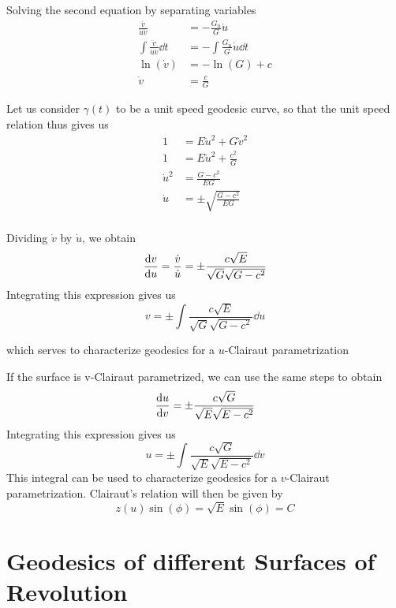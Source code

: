 \documentclass[12pt]{article}
\begin{document}
Solving the second equation by separating variables
\begin{align*}
    \frac{\ddot{v}}{\dot{u}\dot{v}} &= -\frac{G_{u}}{G}\dot{u} \\
    \int \frac{\ddot{v}}{\dot{u}\dot{v}} \dd{t} &= -\int \frac{G_{u}}{G}\dot{u} \dd{t} \\
    \ln(\dot{v}) &= -\ln(G) + c \\
    \dot{v} &= \frac{c}{G}
\end{align*}

Let us consider $\gamma(t)$ to be a unit speed geodesic curve, so that the unit speed relation thus gives us
\begin{align*}
    1 &= E \dot{u}^2 + G \dot{v}^2 \\
    1 &= E \dot{u}^2 + \frac{c^2}{G} \\
    \dot{u}^2 &= \frac{G - c^2}{EG} \\
    \dot{u} &= \pm \sqrt{\frac{G - c^2}{EG}} \\
\end{align*}

Dividing $\dot{v}$ by $\dot{u}$, we obtain
\[
    \dv{v}{u} = \frac{\dot{v}}{\dot{u}} = \pm \frac{c\sqrt{E}}{\sqrt{G}\sqrt{G - c^{2}}} 
\]
Integrating this expression gives us
\begin{equation} \label{eq:v_Clairaut_integral}
    v = \pm \int \frac{c\sqrt{E}}{\sqrt{G}\sqrt{G - c^{2}}} \dd{u}
\end{equation}

which serves to characterize geodesics for a $u$-Clairaut parametrization

If the surface is v-Clairaut parametrized, we can use the same steps to obtain
\[
    \dv{u}{v} = \pm \frac{c\sqrt{G}}{\sqrt{E}\sqrt{E - c^{2}}}
\]
Integrating this expression gives us
\begin{equation} \label{eq:u_Clairaut_integral}
    u = \pm \int \frac{c\sqrt{G}}{\sqrt{E}\sqrt{E - c^{2}}} \dd{v}
\end{equation}
This integral can be used to characterize geodesics for a $v$-Clairaut parametrization.
Clairaut's relation will then be given by
\begin{equation} \label{eq:Clairaut_relation_v}
    z(u) \sin(\phi) = \sqrt{E} \sin(\phi) = C
\end{equation}


\section{Geodesics of different Surfaces of Revolution}
\end{document}

